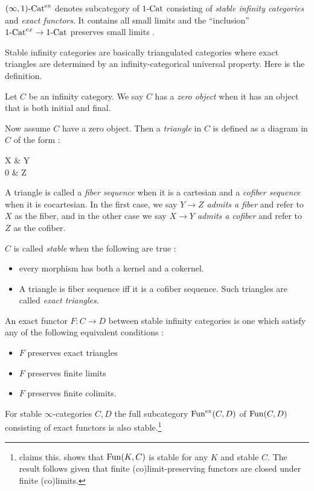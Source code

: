 \documentclass[./main.tex]{subfiles}
\begin{document}
  
$(\infty,1)\text{-}\mathrm{Cat}^\mathrm{ex}$ denotes subcategory of $1\text{-}\mathrm{Cat}$
consisting of \emph{stable infinity categories} and \emph{exact functors}.  
It contains all small limits and
the ``inclusion'' $1\text{-}\mathrm{Cat}^{ex} \to 1\text{-}\mathrm{Cat}$ preserves 
small limits \cite[Prop 1.1.4.4]{Lurie-HA}.

Stable infinity categories are basically
triangulated categories where exact triangles are determined by
an infinity-categorical universal property.
Here is the definition.
\begin{dfn}
  
  Let $C$ be an infinity category. 
  We say $C$ has a \emph{zero object} when
  it has an object that is both initial and final. 
  \cite[Def 1.1.1.1]{Lurie-HA}

  Now assume $C$ have a zero object.
  Then a \emph{triangle} in $C$ is defined as a diagram in $C$ of the form : 
  \begin{cd}
    X & Y \\
    0 & Z
    \arrow[from=1-1,to=1-2]
    \arrow[from=1-1,to=2-1]
    \arrow[from=1-2,to=2-2]
    \arrow[from=2-1,to=2-2]
  \end{cd}
  A triangle is called a \emph{fiber sequence} when it is a cartesian
  and a \emph{cofiber sequence} when it is cocartesian.
  \cite[Def 1.1.1.4]{Lurie-HA}
  In the first case,
  we say \emph{$Y \to Z$ admits a fiber} and refer to $X$ as the fiber,
  and in the other case
  we say \emph{$X \to Y$ admits a cofiber} and refer to $Z$ as the cofiber.

  $C$ is called \emph{stable} when the following are true : 
  \begin{itemize}
    \item every morphism has both a kernel and a cokernel.
    \item A triangle is fiber sequence iff it is a cofiber sequence.
    Such triangles are called \emph{exact triangles}.
  \end{itemize}
  \cite[Prop 1.1.1.9]{Lurie-HA}

  An exact functor $F : C \to D$ between stable infinity categories
  is one which satisfy any of the following equivalent conditions : 
  \cite[Prop 1.1.4.1]{Lurie-HA}
  \begin{itemize}
    \item $F$ preserves exact triangles
    \item $F$ preserves finite limits
    \item $F$ preserves finite colimits.
  \end{itemize}
  
  For stable $\infty$-categories $C, D$
  the full subcategory $\mathrm{Fun}^{\mathrm{ex}}(C,D)$ of $\mathrm{Fun}(C,D)$ consisting of
  exact functors is also stable.\footnote{
    \cite[Ch 1, 5.1.4]{GR1}claims this.
    \cite[Prop 1.1.3.1]{Lurie-HA} shows that $\mathrm{Fun}(K,C)$ is stable for
    any $K$ and stable $C$.
    The result follows given that
    finite (co)limit-preserving functors
    are closed under finite (co)limits.
  }
\end{dfn}
\end{document}
